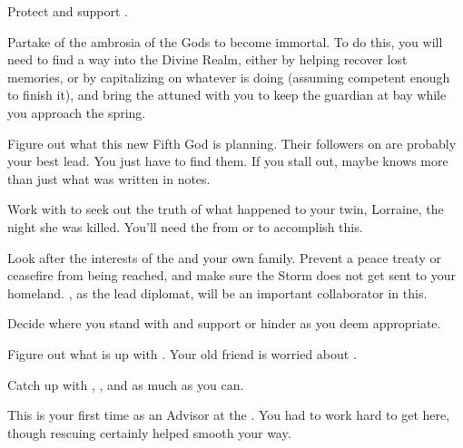 \documentclass[char]{GL2020}
\begin{document}
\begin{itemz}
    \item Protect and support \cDisney{}.
    \item Partake of the ambrosia of the Gods to become immortal. To do this, you will need to find a way into the Divine Realm, either by helping \cDisney{} recover \cDisney{\their} lost memories, or by capitalizing on whatever \cCurse{} is doing (assuming \cCurse{\theyare} competent enough to finish it), and bring the attuned \iScythe{} with you to keep the guardian at bay while you approach the spring.
    \item Figure out what this new Fifth God is planning. Their followers on \pEarth{} are probably your best lead. You just have to find them. If you stall out, maybe \cBunker{} knows more than just what was written in \cBunker{\their} notes.
    \item Work with \cChupStudent{} to seek out the truth of what happened to your twin, Lorraine, the night she was killed. You’ll need the \iMirror{} from \cDiplomat{} or \cHeir{} to accomplish this.
\end{itemz}

\begin{itemz}
    \item Look after the interests of the \pFarm{} and your own family. Prevent a peace treaty or ceasefire from being reached, and make sure the Storm does not get sent to your homeland. \cEvil{}, as the lead diplomat, will be an important collaborator in this.
    \item Decide where you stand with \cPrince{} and support or hinder \cPrince{\them} as you deem appropriate.
    \item Figure out what is up with \cChupStudent{}. Your old friend \cWildCardFriend{} is worried about \cWildCardFriend{\their} \cChupStudent{\offspring}.
     \item Catch up with \cHistory{}, \cHedonist{}, and \cLibrarian{} as much as you can.
\end{itemz}

\begin{itemz}[Notes]
    \item This is your first time as an Advisor at the \pSchool{}. You had to work hard to get here, though rescuing \cDisney{} certainly helped smooth your way.
\end{itemz}
\end{document}
